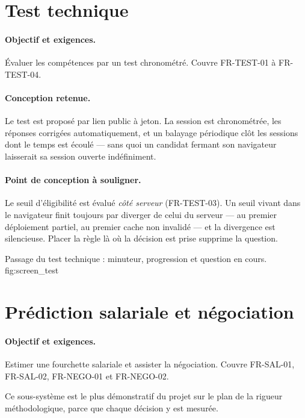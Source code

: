 \section{Test technique}
\label{sec:impl_assessment}

\paragraph{Objectif et exigences.} Évaluer les compétences par un test
chronométré. Couvre FR-TEST-01 à FR-TEST-04.

\paragraph{Conception retenue.} Le test est proposé par lien public à jeton. La
session est chronométrée, les réponses corrigées automatiquement, et un
balayage périodique clôt les sessions dont le temps est écoulé — sans quoi un
candidat fermant son navigateur laisserait sa session ouverte indéfiniment.

\paragraph{Point de conception à souligner.} Le seuil d'éligibilité est évalué
\emph{côté serveur} (FR-TEST-03). Un seuil vivant dans le navigateur finit
toujours par diverger de celui du serveur — au premier déploiement partiel, au
premier cache non invalidé — et la divergence est silencieuse. Placer la règle
là où la décision est prise supprime la question.

  {Passage du test technique : minuteur, progression et question en cours.}
  {fig:screen_test}

\section{Prédiction salariale et négociation}
\label{sec:impl_salary}

\paragraph{Objectif et exigences.} Estimer une fourchette salariale et assister
la négociation. Couvre FR-SAL-01, FR-SAL-02, FR-NEGO-01 et FR-NEGO-02.

Ce sous-système est le plus démonstratif du projet sur le plan de la rigueur
méthodologique, parce que chaque décision y est mesurée.

